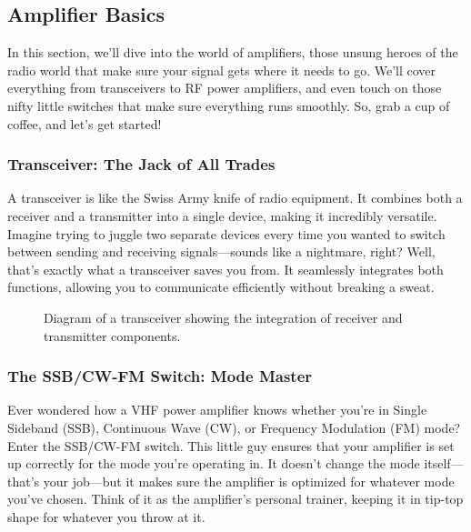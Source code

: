 \subsection{Amplifier Basics}
\label{subsec:amp-basics}

In this section, we'll dive into the world of amplifiers, those unsung heroes of the radio world that make sure your signal gets where it needs to go. We'll cover everything from transceivers to RF power amplifiers, and even touch on those nifty little switches that make sure everything runs smoothly. So, grab a cup of coffee, and let's get started!

\subsubsection*{Transceiver: The Jack of All Trades}
A transceiver is like the Swiss Army knife of radio equipment. It combines both a receiver and a transmitter into a single device, making it incredibly versatile. Imagine trying to juggle two separate devices every time you wanted to switch between sending and receiving signals—sounds like a nightmare, right? Well, that's exactly what a transceiver saves you from. It seamlessly integrates both functions, allowing you to communicate efficiently without breaking a sweat.

\begin{figure}[h!]
    \centering
    \caption{Diagram of a transceiver showing the integration of receiver and transmitter components.}
    \label{fig:transceiver-diagram}
\end{figure}

\subsubsection*{The SSB/CW-FM Switch: Mode Master}
Ever wondered how a VHF power amplifier knows whether you're in Single Sideband (SSB), Continuous Wave (CW), or Frequency Modulation (FM) mode? Enter the SSB/CW-FM switch. This little guy ensures that your amplifier is set up correctly for the mode you're operating in. It doesn't change the mode itself—that's your job—but it makes sure the amplifier is optimized for whatever mode you've chosen. Think of it as the amplifier's personal trainer, keeping it in tip-top shape for whatever you throw at it.

